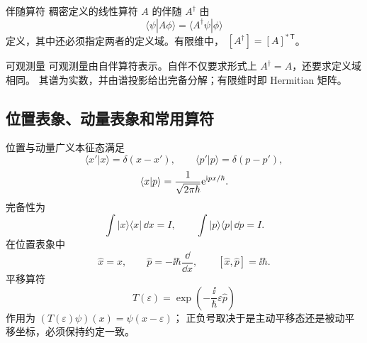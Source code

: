 \begin{advdefinition}{伴随算符}\label{advA6:def:adjoint}
稠密定义的线性算符 $A$ 的伴随 $A^\dagger$ 由
\[
 \langle\psi|A\phi\rangle
 =\langle A^\dagger\psi|\phi\rangle
\]
定义，其中还必须指定两者的定义域。有限维中，
$[A^\dagger]=[A]^{*\,\mathsf T}$。
\end{advdefinition}

\begin{advdefinition}{可观测量}\label{advA6:def:observable}
可观测量由自伴算符表示。自伴不仅要求形式上
$A^\dagger=A$，还要求定义域相同。
其谱为实数，并由谱投影给出完备分解；有限维时即 Hermitian 矩阵。
\end{advdefinition}

\subsection{位置表象、动量表象和常用算符}

位置与动量广义本征态满足
\[
 \langle x'|x\rangle=\delta(x-x'),\qquad
 \langle p'|p\rangle=\delta(p-p'),
\]
\[
 \langle x|p\rangle=
 \frac1{\sqrt{2\pi\hbar}}\mathrm e^{\mathrm i px/\hbar}.
\]
完备性为
\[
 \int|x\rangle\langle x|\,\dd x=I,\qquad
 \int|p\rangle\langle p|\,\dd p=I.
\]
在位置表象中
\[
 \widehat x=x,\qquad
 \widehat p=-\ii\hbar\frac{\dd}{\dd x},\qquad
 [\widehat x,\widehat p]=\ii\hbar.
\]
平移算符
\[
 T(\varepsilon)=\exp\!\left(-\frac{\ii}{\hbar}
 \varepsilon\widehat p\right)
\]
作用为
$(T(\varepsilon)\psi)(x)=\psi(x-\varepsilon)$；
正负号取决于是主动平移态还是被动平移坐标，必须保持约定一致。


